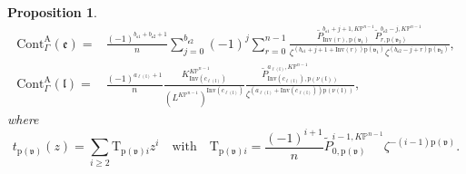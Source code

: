 \documentclass[12pt]{amsart}
\newtheorem{prop}{Proposition}[section]
\numberwithin{equation}{section}
\newcommand{\KP}{K\mathbb{P}}
\begin{document}
\begin{prop}
\begin{equation*}
\begin{split}
    \mathrm{Cont}_{\Gamma}^{\mathrm{A}}(\mathfrak{e})
    =&\frac{(-1)^{b_{\mathfrak{e}1}+b_{\mathfrak{e}2}+1}}{n} \sum_{j=0}^{b_{\mathfrak{e}2}}(-1)^{j} \sum_{r=0}^{n-1}\frac{\widetilde{P}_{\mathrm{Inv}(r),\mathrm{p}(\mathfrak{v}_1)}^{b_{\mathfrak{e}1}+j+1,\KP^{n-1}}\widetilde{P}_{r,\mathrm{p}(\mathfrak{v}_2)}^{b_{\mathfrak{e}2}-j,\KP^{n-1}}}{\zeta^{(b_{\mathfrak{e}1}+j+1+\mathrm{Inv}(r))\mathrm{p}(\mathfrak{v}_1)}\zeta^{(b_{\mathfrak{e}2}-j+r)\mathrm{p}(\mathfrak{v}_2)}},\\
    \mathrm{Cont}_{\Gamma}^{\mathrm{A}}(\mathfrak{l})
    =&\frac{(-1)^{a_{\ell(\mathfrak{l})}+1}}{n}\frac{K^{\KP^{n-1}}_{\mathrm{Inv}(c_{\ell(\mathfrak{l})})}}{(L^{\KP^{n-1}})^{\mathrm{Inv}(c_{\ell(\mathfrak{l})})}}
    \frac{\widetilde{P}_{\mathrm{Inv}(c_{\ell(\mathfrak{l})}),\mathrm{p}(\nu(\mathfrak{l}))}^{{a_{\ell(\mathfrak{l})}},\KP^{n-1}}}{     \zeta^{({a_{\ell(\mathfrak{l})}}+{\mathrm{Inv}(c_{\ell(\mathfrak{l})})})\mathrm{p}(\nu(\mathfrak{l}))}},
\end{split}
\end{equation*}
where
\begin{equation*}
t_{\mathrm{p}(\mathfrak{v})}(z)=\sum_{i\geq{2}}\mathrm{T}_{\mathrm{p}(\mathfrak{v})i}z^i\quad\text{with}\quad \mathrm{T}_{\mathrm{p}(\mathfrak{v})i}=\frac{(-1)^{i+1}}{n}\widetilde{P}_{0,\mathrm{p}(\mathfrak{v})}^{i-1,\KP^{n-1}}\zeta^{-{(i-1)}\mathrm{p}(\mathfrak{v})}.
\end{equation*}
\end{prop}
\end{document}

